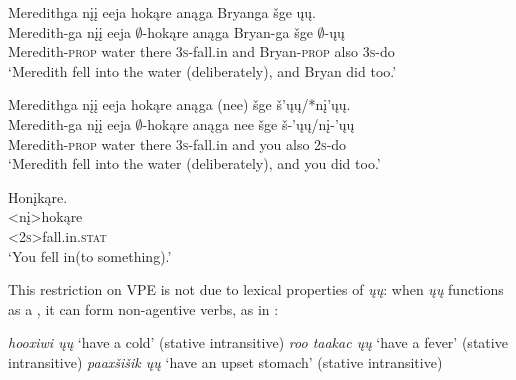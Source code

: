 \documentclass[output=paper]{LSP/langsci}
\begin{document}
 
\ea\label{ex:johnson:21}
\ea\label{ex:johnson:21a} 
\glll Meredithga nįį eeja hokąre anąga Bryanga šge ųų.\\
Meredith-ga nįį eeja $\emptyset$-hokąre anąga Bryan-ga šge {\db}$\emptyset$-ųų\\
Meredith-\textsc{prop} water there \textsc{3s}-fall.in and Bryan-\textsc{prop} also {\db}\textsc{3s}-do\\
\trans `Meredith fell into the water (deliberately), and Bryan did too.'
 
\ex\label{ex:johnson:21b} 
\glll Meredithga nįį eeja hokąre anąga (nee) šge š'ųų/*nį'ųų.\\
Meredith-ga nįį eeja $\emptyset$-hokąre anąga nee šge š-'ųų/nį-'ųų\\
Meredith-\textsc{prop} water there \textsc{3s}-fall.in and you also \textsc{2s}-do\\
\trans `Meredith fell into the water (deliberately), and you did too.'
\z
\z
 
\ea\label{ex:johnson:22} 
\glll Honįkąre.\\
<nį>hokąre\\
<\textsc{2s}>fall.in.\textsc{stat}\\
\trans `You fell in(to something).' \citep{Hartmann2012}
\z
	
This restriction on VPE is not due to lexical properties of \emph{ųų}: when \emph{ųų} functions as a , it can form non-agentive verbs, as in :

 
\ea\label{ex:johnson:23}
\ea 
\textit{hooxiwi ųų} `have a cold' (stative intransitive)
\vspace{12pt}
\ex 
\textit{roo taakac ųų} `have a fever' (stative intransitive)
\vspace{12pt}
\ex 
\textit{paaxšišik ųų} `have an upset stomach' (stative intransitive)\\
\citep{Hartmann2012}
\z
\z
\end{document}
